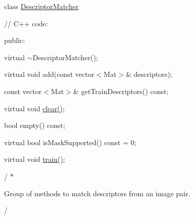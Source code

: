 class \mbox{\hyperlink{classorg_1_1opencv_1_1features2d_1_1_descriptor_matcher}{Descriptor\+Matcher}} {\ttfamily }

{\ttfamily }

{\ttfamily }

{\ttfamily // C++ code\+:}

{\ttfamily }

{\ttfamily }

{\ttfamily public\+:}

{\ttfamily }

{\ttfamily }

{\ttfamily virtual $\sim$\+Descriptor\+Matcher();}

{\ttfamily }

{\ttfamily }

{\ttfamily virtual void add(const vector$<$\+Mat$>$\& descriptors);}

{\ttfamily }

{\ttfamily }

{\ttfamily const vector$<$\+Mat$>$\& get\+Train\+Descriptors() const;}

{\ttfamily }

{\ttfamily }

{\ttfamily virtual void \mbox{\hyperlink{classorg_1_1opencv_1_1features2d_1_1_descriptor_matcher_a1e843e5c3ff04bf99a5a3d5333da2115}{clear()}};}

{\ttfamily }

{\ttfamily }

{\ttfamily bool empty() const;}

{\ttfamily }

{\ttfamily }

{\ttfamily virtual bool is\+Mask\+Supported() const = 0;}

{\ttfamily }

{\ttfamily }

{\ttfamily virtual void \mbox{\hyperlink{classorg_1_1opencv_1_1features2d_1_1_descriptor_matcher_a6c4da7f3f15fbea1000c509fec8ad1b9}{train()}};}

{\ttfamily }

{\ttfamily }

{\ttfamily / $\ast$}

{\ttfamily  
\begin{DoxyItemize}
\item Group of methods to match descriptors from an image pair. 
\item / 
\end{DoxyItemize}}

